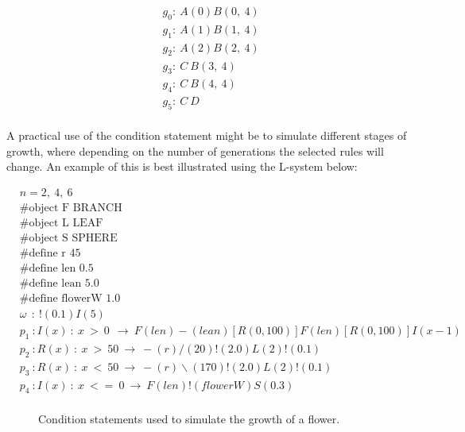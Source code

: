 \begin{singlespace}
\begin{equation} \label{parametric l-system example result}
\begin{aligned}
	&g_0 :~ A(0)B(0,~4)\\
	&g_1 :~ A(1)B(1,~4)\\
	&g_2 :~ A(2)B(2,~4)\\
	&g_3 :~ C~B(3,~4)\\
	&g_4 :~ C~B(4,~4)\\
	&g_5 :~ C~D\\
\end{aligned}
\end{equation}
\end{singlespace}

\noindent
A practical use of the condition statement might be to simulate different stages of growth, where depending on the number of generations the selected rules will change. An example of this is best illustrated using the L-system below: 

\begin{singlespace}
\begin{equation} \label{conditional l-system example}
\begin{aligned}
	&n=2,~4,~6 \\
	&\#\text{object F BRANCH} \\
 	&\#\text{object L LEAF} \\
	&\#\text{object S SPHERE} \\
	&\#\text{define r 45} \\
	&\#\text{define len 0.5} \\
	&\#\text{define lean 5.0} \\
	&\#\text{define flowerW 1.0} \\
	&\omega~~ :~ !(0.1)I(5)\\
	&p_1~ :  I(x)~ :~ x~ >~ 0~~ \rightarrow~ F(len)-(lean)[R({0, 100})]F(len)[R({0, 100})]I(x-1)\\
	&p_2~ :  R(x)~ :~ x~ >~ 50~ \rightarrow~ -(r)/(20)!(2.0)L(2)!(0.1)\\
	&p_3~ :  R(x)~ :~ x~ <~ 50~ \rightarrow~ -(r)\backslash(170)!(2.0)L(2)!(0.1)\\
	&p_4~ :  I(x)~ :~ x~ <=~ 0~ \rightarrow~ F(len)!(flowerW)S(0.3)\\
\end{aligned}
\end{equation}
\end{singlespace}

\begin{figure}[htbp]
	{\centering
		\vspace{7px}
		\setlength{\fboxrule}{1pt}
		\caption{Condition statements used to simulate the growth of a flower.}
	}
\end{figure}
\FloatBarrier

